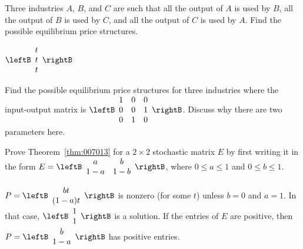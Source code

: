 \begin{multicols}{2}
\begin{ex}
\begin{sol}
\begin{enumerate}[label={\alph*.}]
\end{enumerate}
\end{sol}
\end{ex}

\begin{ex}
Three industries $A$, $B$, and $C$ are such that all the output of $A$ is used by $B$, all the output of $B$ is used by $C$, and all the output of $C$ is used by $A$. Find the possible equilibrium price structures.

\begin{sol}
$\leftB \begin{array}{r}
t \\
t \\
t
\end{array} \rightB$
\end{sol}
\end{ex}

\begin{ex}
Find the possible equilibrium price structures for three industries where the input-output matrix is $\leftB \begin{array}{rrr}
1 & 0 & 0 \\
0 & 0 & 1 \\
0 & 1 & 0
\end{array} \rightB$. Discuss why there are two parameters here.
\end{ex}

\begin{ex}
Prove Theorem~\ref{thm:007013} for a $2 \times 2$ stochastic matrix $E$ by first writing it in the form $E = \leftB \begin{array}{cc}
a & b \\
1 - a & 1 - b
\end{array} \rightB$, where $0 \leq a \leq 1$ and $0 \leq b \leq 1$.

\begin{sol}
$P = \leftB \begin{array}{c}
bt \\
(1 - a)t
\end{array} \rightB$
 is nonzero (for some $t$) unless $b = 0$ and $a = 1$. In that case, $\leftB \begin{array}{r}
 1 \\
 1
 \end{array} \rightB$
 is a solution. If the entries of $E$ are positive, then $P = \leftB \begin{array}{c}
 b \\
 1 - a
 \end{array} \rightB$
 has positive entries.
\end{sol}
\end{ex}


\end{multicols}
